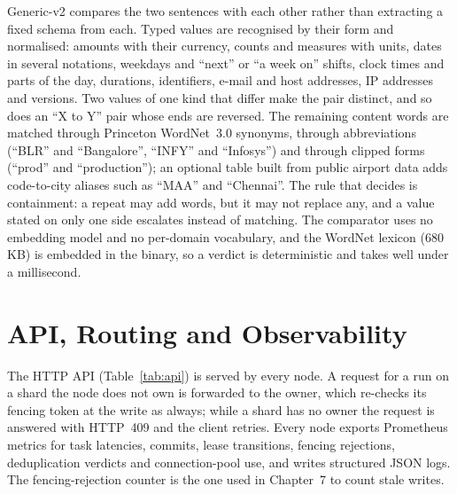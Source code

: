 Generic-v2 compares the two sentences with each other rather than extracting
a fixed schema from each. Typed values are recognised by their form and
normalised: amounts with their currency, counts and measures with units,
dates in several notations, weekdays and ``next'' or ``a week on''
shifts, clock times and parts of the day, durations, identifiers, e-mail and
host addresses, IP addresses and versions. Two values of one kind that
differ make the pair distinct, and so does an ``X to Y'' pair whose ends
are reversed. The remaining content words are matched through Princeton
WordNet~3.0 synonyms, through abbreviations (``BLR'' and ``Bangalore'',
``INFY'' and ``Infosys'') and through clipped forms (``prod'' and
``production''); an optional table built from public airport data adds
code-to-city aliases such as ``MAA'' and ``Chennai''. The rule that decides
is containment: a repeat may add words, but it may not replace any, and a
value stated on only one side escalates instead of matching. The comparator
uses no embedding model and no per-domain vocabulary, and the WordNet
lexicon (680\,KB) is embedded in the binary, so a verdict is deterministic
and takes well under a millisecond.

\section{API, Routing and Observability}

The HTTP API (Table~\ref{tab:api}) is served by every node. A request for a
run on a shard the node does not own is forwarded to the owner, which
re-checks its fencing token at the write as always; while a shard has no
owner the request is answered with HTTP~409  and the client
retries. Every node exports
Prometheus metrics for task latencies, commits, lease transitions, fencing
rejections, deduplication verdicts and connection-pool use, and writes
structured JSON logs. The fencing-rejection counter is the one used in
Chapter~7 to count stale writes.

